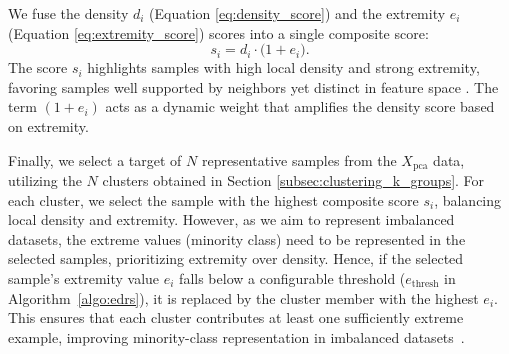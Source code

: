 \documentclass[preprint,12pt]{elsarticle}
\begin{document}
We fuse the density $d_i$ (Equation \ref{eq:density_score}) and the extremity $e_i$ (Equation \ref{eq:extremity_score}) scores into a single composite score:
\begin{equation} \label{eq:composite_score}
    s_i = d_i \cdot \bigl(1 + e_i\bigr).
\end{equation}
The score $s_i$ highlights samples with high local density and strong extremity, favoring samples well supported by neighbors yet distinct in feature space \cite{wang2022unsupervised,qu2021outlier}. The term $(1+e_i)$ acts as a dynamic weight that amplifies the density score based on extremity.

Finally, we select a target of $N$ representative samples from the $X_{\text{pca}}$ data, utilizing the $N$ clusters obtained in Section \ref{subsec:clustering_k_groups}. For each cluster, we select the sample with the highest composite score $s_i$, balancing local density and extremity. However, as we aim to represent imbalanced datasets, the extreme values (minority class) need to be represented in the selected samples, prioritizing extremity over density. Hence, if the selected sample's extremity value $e_i$ falls below a configurable threshold ($e_{\text{thresh}}$ in Algorithm~\ref{algo:edrs}), it is replaced by the cluster member with the highest $e_i$. This ensures that each cluster contributes at least one sufficiently extreme example, improving minority-class representation in imbalanced datasets~\cite{lakhina2004diagnosing}.
\end{document}
